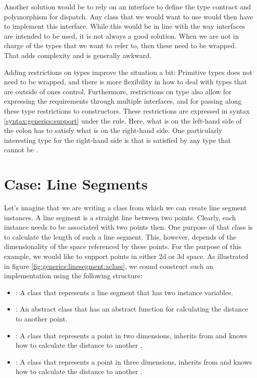 Another solution would be to rely on an interface to define the type contract and polymorphism for dispatch. Any class that we would want to use would then have to implement this interface. While this would be in line with the way interfaces are intended to be used, it is not always a good solution. When we are not in charge of the types that we want to refer to, then these need to be wrapped. That adds complexity and is generally awkward.

Adding restrictions on types improve the situation a bit: Primitive types does not need to be wrapped, and there is more flexibility in how to deal with types that are outside of ones control. Furthermore, restrictions on type also allow for expressing the requirements through multiple interfaces, and for passing along these type restrictions to constructors. These restrictions are expressed in syntax \ref{syntax:generics:support} under the  rule. Here, what is on the left-hand side of the colon has to satisfy what is on the right-hand side. One particularly interesting type for the right-hand side is  that is satisfied by any type that cannot be .

\section{Case: Line Segments}

Let's imagine that we are writing a  class from which we can create line segment instances. A line segment is a straight line between two points. Clearly, each instance needs to be associated with two points then. One purpose of that class is to calculate the length of such a line segment. This, however, depends of the dimensionality of the space referenced by these points. For the purpose of this example, we would like to support points in either 2d or 3d space. As illustrated in figure \ref{fig:generics:linesegment:aclass}, we cound construct such an implementation using the following structure:
\begin{itemize}
  \item {}: A class that represents a line segment that has two  instance variables.
  \item {}: An abstract class that has an abstract function for calculating the distance to another point.
  \item {}: A class that represents a point in two dimensions, inherits from  and knows how to calculate the distance to another .
  \item {}: A class that represents a point in three dimensions, inherits from  and knows how to calculate the distance to another .
\end{itemize}

